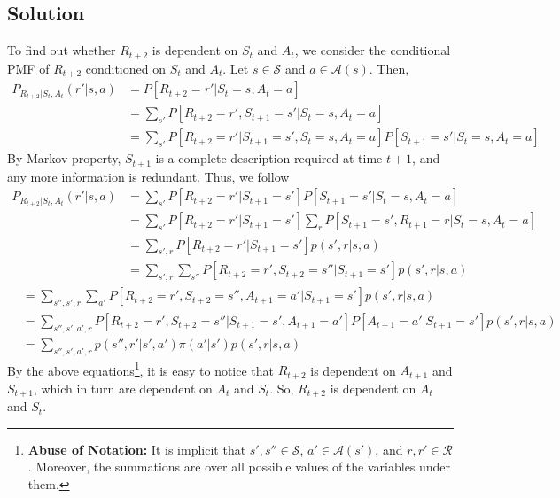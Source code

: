 \documentclass[11pt]{article}
\begin{document}
    \subsection*{Solution}
    To find out whether $R_{t+2}$ is dependent on $S_{t}$ and $A_{t}$, we consider the conditional PMF of $R_{t+2}$
    conditioned on $S_{t}$ and $A_{t}$. Let $s \in \mathcal{S}$ and $a \in \mathcal{A}(s)$. Then,
    \begin{align*}
        P_{R_{t+2} | S_{t}, A_{t}}(r' | s, a) &= P[R_{t+2} = r' | S_{t} = s, A_{t} = a] \\
        &= \sum_{s'} P[R_{t+2} = r', S_{t+1} = s' | S_{t} = s, A_{t} = a] \\
        &= \sum_{s'} P[R_{t+2} = r' | S_{t+1} = s', S_{t} = s, A_{t} = a] P[S_{t+1} = s' | S_{t} = s, A_{t} = a]
    \end{align*}
    By Markov property, $S_{t+1}$ is a complete description required at time $t+1$, and any more information is
    redundant. Thus, we follow
    \begin{align*}
        P_{R_{t+2} | S_{t}, A_{t}}(r' | s, a) &= \sum_{s'} P[R_{t+2} = r' | S_{t+1} = s'] P[S_{t+1} = s' | S_{t} = s, A_{t} = a] \\
        &= \sum_{s'} P[R_{t+2} = r' | S_{t+1} = s'] \sum_{r} P[S_{t+1} = s', R_{t+1} = r | S_{t} = s, A_{t} = a] \\
        &= \sum_{s', r} P[R_{t+2} = r' | S_{t+1} = s'] p(s', r | s, a) \\
        &= \sum_{s', r} \sum_{s''} P[R_{t+2} = r', S_{t+2} = s'' | S_{t+1} = s'] p(s', r | s, a)
    \end{align*}
    \begin{align*}
        &= \sum_{s'', s', r} \sum_{a'} P[R_{t+2} = r', S_{t+2} = s'', A_{t+1} = a' | S_{t+1} = s'] p(s', r | s, a) \\
        &= \sum_{s'', s', a', r} P[R_{t+2} = r', S_{t+2} = s'' | S_{t+1} = s', A_{t+1} = a'] P[A_{t+1} = a' | S_{t+1} = s'] p(s', r | s, a) \\
        &= \sum_{s'', s', a', r} p(s'', r' | s', a') \pi(a' | s')  p(s', r | s, a)
    \end{align*}
    By the above equations\footnote{
        \textbf{Abuse of Notation:} It is implicit that $s', s'' \in \mathcal{S}$, $a' \in \mathcal{A}(s')$,
        and $r, r' \in \mathcal{R}$. Moreover, the summations are over all possible values of the variables under them.
    }, it is easy to notice that $R_{t+2}$ is dependent on $A_{t+1}$ and $S_{t+1}$, which in turn
    are dependent on $A_{t}$ and $S_{t}$. So, $R_{t+2}$ is dependent on $A_{t}$ and $S_{t}$.
\end{document}
